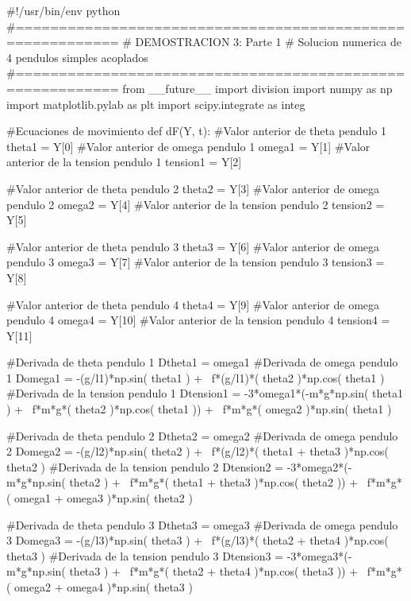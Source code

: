 \begin{listing}[style=python]
#!/usr/bin/env python
#==========================================================
# DEMOSTRACION 3: Parte 1
# Solucion numerica de 4 pendulos simples acoplados
#==========================================================
from __future__ import division
import numpy as np
import matplotlib.pylab as plt
import scipy.integrate as integ

#Ecuaciones de movimiento
def dF(Y, t):
    #Valor anterior de theta pendulo 1
    theta1 = Y[0]
    #Valor anterior de omega pendulo 1
    omega1 = Y[1]
    #Valor anterior de la tension pendulo 1
    tension1 = Y[2]
    
    #Valor anterior de theta pendulo 2
    theta2 = Y[3]
    #Valor anterior de omega pendulo 2
    omega2 = Y[4]
    #Valor anterior de la tension pendulo 2
    tension2 = Y[5]
    
    #Valor anterior de theta pendulo 3
    theta3 = Y[6]
    #Valor anterior de omega pendulo 3
    omega3 = Y[7]
    #Valor anterior de la tension pendulo 3
    tension3 = Y[8]
    
    #Valor anterior de theta pendulo 4
    theta4 = Y[9]
    #Valor anterior de omega pendulo 4
    omega4 = Y[10]
    #Valor anterior de la tension pendulo 4
    tension4 = Y[11]
    
    #Derivada de theta pendulo 1
    Dtheta1 = omega1
    #Derivada de omega pendulo 1
    Domega1 = -(g/l1)*np.sin( theta1 ) + \
    f*(g/l1)*( theta2 )*np.cos( theta1 )
    #Derivada de la tension pendulo 1
    Dtension1 = -3*omega1*(-m*g*np.sin( theta1 ) + \
    f*m*g*( theta2 )*np.cos( theta1 )) + \
    f*m*g*( omega2 )*np.sin( theta1 )
    
    #Derivada de theta pendulo 2
    Dtheta2 = omega2
    #Derivada de omega pendulo 2
    Domega2 = -(g/l2)*np.sin( theta2 ) + \
    f*(g/l2)*( theta1 + theta3 )*np.cos( theta2 )
    #Derivada de la tension pendulo 2
    Dtension2 = -3*omega2*(-m*g*np.sin( theta2 ) + \
    f*m*g*( theta1 + theta3 )*np.cos( theta2 )) + \
    f*m*g*( omega1 + omega3 )*np.sin( theta2 )
    
    #Derivada de theta pendulo 3
    Dtheta3 = omega3
    #Derivada de omega pendulo 3
    Domega3 = -(g/l3)*np.sin( theta3 ) + \
    f*(g/l3)*( theta2 + theta4 )*np.cos( theta3 )
    #Derivada de la tension pendulo 3
    Dtension3 = -3*omega3*(-m*g*np.sin( theta3 ) + \
    f*m*g*( theta2 + theta4 )*np.cos( theta3 )) + \
    f*m*g*( omega2 + omega4 )*np.sin( theta3 )
    

\end{listing}
